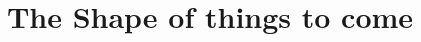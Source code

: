 \documentclass{ximera}
\title{The Shape of things to come}
\begin{document}
\begin{abstract}
\end{abstract}
\maketitle
\end{document}
